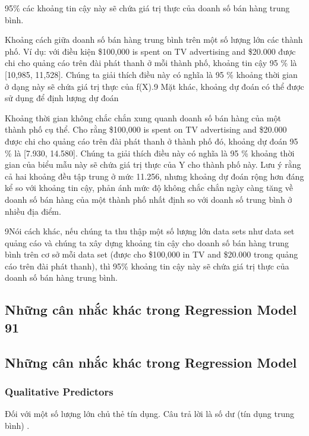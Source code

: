 95\% các khoảng tin cậy này sẽ chứa giá trị thực của doanh số bán hàng trung bình.

Khoảng cách giữa doanh số bán hàng trung bình trên một số lượng lớn các thành phố. Ví dụ: với điều kiện \$100,000 is spent on TV advertising and \$20.000 được chi cho quảng cáo trên đài phát thanh ở mỗi thành phố, khoảng tin cậy 95 \% là [10,985, 11,528]. Chúng ta giải thích điều này có nghĩa là 95 \% khoảng thời gian ở dạng này sẽ chứa giá trị thực của f(X).9 Mặt khác, khoảng dự đoán có thể được sử dụng để định lượng dự đoán

Khoảng thời gian không chắc chắn xung quanh doanh số bán hàng của một thành phố cụ thể. Cho rằng \$100,000 is spent on TV advertising and \$20.000 được chi cho quảng cáo trên đài phát thanh ở thành phố đó, khoảng dự đoán 95 \% là [7.930, 14.580]. Chúng ta giải thích điều này có nghĩa là 95 \% khoảng thời gian của biểu mẫu này sẽ chứa giá trị thực của Y cho thành phố này. Lưu ý rằng cả hai khoảng đều tập trung ở mức 11.256, nhưng khoảng dự đoán rộng hơn đáng kể so với khoảng tin cậy, phản ánh mức độ không chắc chắn ngày càng tăng về doanh số bán hàng của một thành phố nhất định so với doanh số trung bình ở nhiều địa điểm.

9Nói cách khác, nếu chúng ta thu thập một số lượng lớn data sets như data set quảng cáo và chúng ta xây dựng khoảng tin cậy cho doanh số bán hàng trung bình trên cơ sở mỗi data set (được cho \$100,000 in TV and \$20.000 trong quảng cáo trên đài phát thanh), thì 95\% khoảng tin cậy này sẽ chứa giá trị thực của doanh số bán hàng trung bình.

\subsection{Những cân nhắc khác trong Regression Model 91}

\subsection{Những cân nhắc khác trong Regression Model}

\subsubsection{Qualitative Predictors}

Đối với một số lượng lớn chủ thẻ tín dụng. Câu trả lời là số dư (tín dụng trung bình) .

